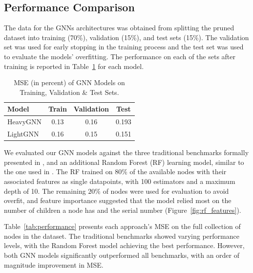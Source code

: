 \documentclass[letterpaper]{article}
\begin{document}
\subsection{Performance Comparison}

The data for the GNNs architectures was obtained from splitting the pruned dataset into training (70\%), validation (15\%), and test sets (15\%). The validation set was used for early stopping in the training process and the test set was used to evaluate the models' overfitting. The performance on each of the sets after training is reported in Table~\ref{tab:train-test} for each model.

\begin{table}[t]
    \centering
    \caption{MSE (in percent) of GNN Models on Training, Validation \& Test Sets.}
    \label{tab:train-test}
    \begin{tabular}{|l|c|c|c|}
    \hline
    \textbf{Model} & \textbf{Train} & \textbf{Validation} & \textbf{Test} \\
    \hline
    HeavyGNN & 0.13 & 0.16 & 0.193 \\
    LightGNN & 0.16 & 0.15 & 0.151 \\
    \hline
    \end{tabular}
\end{table}

We evaluated our GNN models against the three traditional benchmarks formally presented in ,
and an additional Random Forest (RF) learning model, similar to the one used in \citet{sudry2022learning}.
The RF trained on $80\%$ of the available nodes with their associated features as single datapoints, with 100 estimators and a maximum depth of 10. The remaining $20\%$ of nodes were used for evaluation to avoid overfit, and feature importance suggested that the model relied most on the number of children a node has and the serial number (Figure~\ref{fig:rf_features}).

Table~\ref{tab:performance} presents each approach's MSE on the full collection of nodes in the dataset. The traditional benchmarks showed varying performance levels, with the Random Forest model achieving the best performance. However, both GNN models significantly outperformed all benchmarks, with an order of magnitude improvement in MSE.
\end{document}
